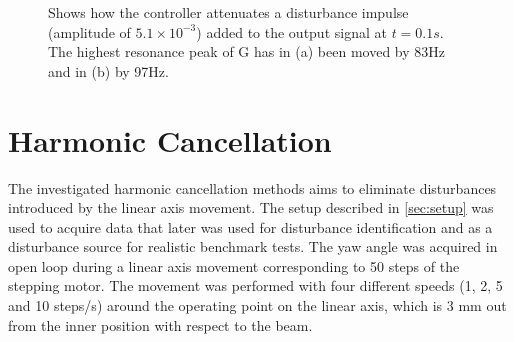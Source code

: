 \begin{figure}[h!]
  \centering %
  \qquad
  \caption{\label{fig:model_dist_high_order} Shows how the controller attenuates a disturbance impulse (amplitude of $5.1 \times 10^{-3}$) added to the output signal at $t=0.1s$. The highest resonance peak of G has in (a) been moved by 83Hz and in (b) by 97Hz.}
\end{figure}

\newpage
\FloatBarrier
\section{Harmonic Cancellation}
The investigated harmonic cancellation methods aims to eliminate disturbances introduced by the linear axis movement. The setup described in \ref{sec:setup} was used to acquire data that later was used for disturbance identification and as a disturbance source for realistic benchmark tests. The yaw angle was acquired in open loop during a linear axis movement corresponding to 50 steps of the stepping motor. The movement was performed with four different speeds (1, 2, 5 and 10 steps/s) around the operating point on the linear axis, which is 3 mm out from the inner position with respect to the beam.

